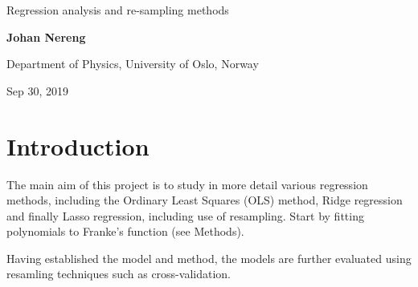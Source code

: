 \documentclass[%
oneside,                 %
final,                   %
10pt]{article}
\begin{document}

\newcommand{\exercisesection}[1]{\subsection*{#1}}






\thispagestyle{empty}

\begin{center}
{\LARGE\bf
\begin{spacing}{1.25}
Regression analysis and re-sampling methods
\end{spacing}
}
\end{center}


\begin{center}
{\bf Johan Nereng}
\end{center}

    \begin{center}
\centerline{{\small Department of Physics, University of Oslo, Norway}}
\end{center}
    

\begin{center}
Sep 30, 2019
\end{center}

\vspace{5cm}
\begin{abstract}

\end{abstract}

\newpage

\section{Introduction}
The main aim of this project is to study in more detail various regression methods,
including the Ordinary Least Squares (OLS) method, Ridge regression and finally
Lasso regression, including use of resampling. Start by fitting polynomials to Franke's function (see Methods). 

Having established the model and method, the models are further evaluated using resamling
techniques such as cross-validation.
\end{document}
